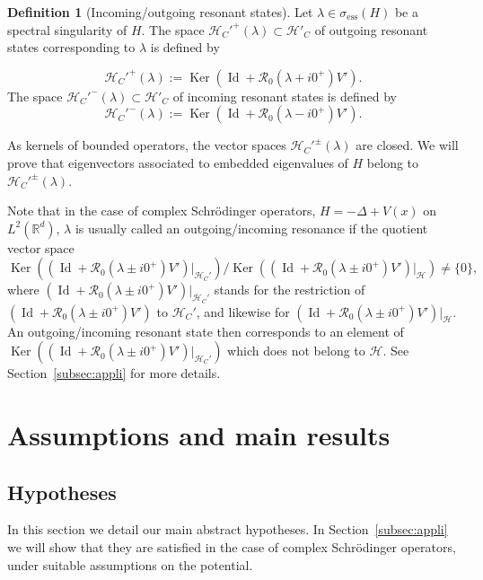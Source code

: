 \documentclass[10pt]{amsart}
\theoremstyle{definition}\newtheorem{defi}[theo]{Definition}\newtheorem{rema}[theo]{Remark}\newtheorem{exam}[theo]{Example}\newtheorem{exem}[theo]{Example}\newtheorem{nota}[theo]{Notation}
\newcommand{\Hi}{\mathcal{H}}
\newcommand{\R}{\mathbb{R}}
\newcommand{\ess}{\mathrm{ess}}
\newcommand{\Res}{\mathcal{R}}
\DeclareMathOperator{\Ker}{Ker}
\DeclareMathOperator{\Id}{Id}
\begin{document}
\begin{defi}[Incoming/outgoing resonant states]\label{def:resonant}
Let $\lambda\in\sigma_\ess(H)$ be a spectral singularity of $H$. The space $\Hi_C'^+(\lambda)\subset\Hi'_C$ of outgoing resonant states corresponding to $\lambda$ is defined by

\begin{equation*}
\Hi_C'^+(\lambda):=\Ker\left(\Id+\Res_0(\lambda+i0^+)V'\right).
\end{equation*}
The space $\Hi_C'^-(\lambda)\subset\Hi'_C$ of incoming resonant states is defined by
\begin{equation*}
\Hi_C'^-(\lambda):=\Ker\left(\Id+\Res_0(\lambda-i0^+)V'\right).
\end{equation*}
\end{defi}

As kernels of bounded operators, the vector spaces $\Hi_C'^{\pm}(\lambda)$ are closed. We will prove that eigenvectors associated to embedded eigenvalues of $H$ belong to $\Hi_C'^\pm(\lambda)$.

Note that in the case of complex Schr\"odinger operators, $H=-\Delta+V(x)$ on $L^2(\R^d)$, $\lambda$ is usually called an outgoing/incoming resonance if the quotient vector space
\begin{equation*}
\Ker\left(\left(\Id+\Res_0(\lambda\pm i0^+)V'\right)|_{\Hi_C'}\right)\slash \Ker\left(\left(\Id+\Res_0(\lambda\pm i0^+)V'\right)|_{\Hi}\right)\neq\lbrace 0\rbrace,
\end{equation*}
where $(\Id+\Res_0(\lambda\pm i0^+)V')|_{\Hi_C'}$ stands for the restriction of $(\Id+\Res_0(\lambda\pm i0^+)V')$ to $\Hi_C'$, and likewise for $(\Id+\Res_0(\lambda\pm i0^+)V')|_{\Hi}$. An outgoing/incoming resonant state then corresponds to an element of $\Ker((\Id+\Res_0(\lambda\pm i0^+)V')|_{\Hi_C'})$ which does not belong to $\Hi$. See Section~\ref{subsec:appli} for more details.



\section{Assumptions and main results}\label{sec:results}

\subsection{Hypotheses}
In this section we detail our main abstract hypotheses. In Section~\ref{subsec:appli} we will show that they are satisfied in the case of complex Schr\"odinger operators, under suitable assumptions on the potential.
\end{document}
